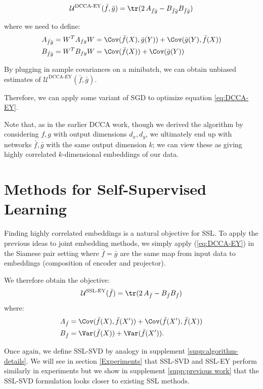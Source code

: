 \begin{align}\label{eq:DCCA-EY}
    \mathcal{U}^\text{DCCA-EY}(\bar{f},\bar{g}) = \tr(2 \, A_{\bar{f}\bar{g}} - B_{\bar{f}\bar{g}} B_{\bar{f}\bar{g}})
\end{align}

where we need to define:
\begin{align*}
    A_{\bar{f}\bar{g}}
    &= W^T A_{fg} W 
    = \Cov(\bar{f}(X),\bar{g}(Y)) + \Cov(\bar{g}(Y),\bar{f}(X)) \\
    B_{\bar{f}\bar{g}} 
    &= W^T B_{fg} W 
    = \Cov(\bar{f}(X)) + \Cov(\bar{g}(Y))
\end{align*}


By plugging in sample covariances on a minibatch, we can obtain unbiased estimates of $\mathcal{U}^\text{DCCA-EY}(\bar{f},\bar{g})$.

Therefore, we can apply some variant of SGD to optimize equation \ref{eq:DCCA-EY}.

Note that, as in the earlier DCCA work, though we derived the algorithm by considering $f,g$ with output dimensions $d_x,d_y$, we ultimately end up with networks $\bar{f},\bar{g}$ with the same output dimension $k$; we can view these as giving highly correlated $k$-dimensional embeddings of our data.

\section{Methods for Self-Supervised Learning}


Finding highly correlated embeddings is a natural objective for SSL.
To apply the previous ideas to joint embedding methods, we simply apply (\ref{eq:DCCA-EY}) in the Siamese pair setting where $\bar{f}=\bar{g}$ are the same map from input data to embeddings (composition of encoder and projector).

We therefore obtain the objective:
\begin{align}\label{eq:SSL-EY}
    \mathcal{U}^\text{SSL-EY}(\bar{f}) =\tr( 2 \, A_{\bar{f}} - B_{\bar{f}} B_{\bar{f}})
\end{align}
where:
\begin{align*}
    A_{\bar{f}}
    &= \Cov(\bar{f}(X),\bar{f}(X')) + \Cov(\bar{f}(X'),\bar{f}(X)) \\
    B_{\bar{f}} 
    &= \Var(\bar{f}(X)) + \Var(\bar{f}(X')).
\end{align*}

Once again, we define SSL-SVD by analogy in supplement \ref{supp:algorithm-details}. We will see in section \ref{Experiments} that SSL-SVD and SSL-EY perform similarly in experiments but we show in supplement \ref{supp:previous work} that the SSL-SVD formulation looks closer to existing SSL methods.

